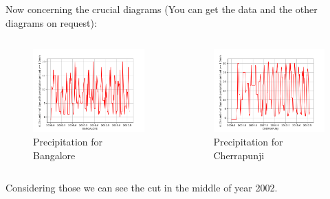 \documentclass[10pt]{beamer}
\begin{document}
\begin{frame}
	Now concerning the crucial diagrams (You can get the data and the other diagrams on request):
	\begin{columns}
		\begin{column}{0.5\textwidth}
			\begin{figure}
				\includegraphics[width=1.2\textwidth]{BangalorePrecipitation1mm.png}
				\caption{Precipitation for Bangalore}
			\end{figure}
		\end{column}
		\begin{column}{0.5\textwidth}
			\begin{figure}
				\includegraphics[width=1.2\textwidth]{CherrapunjiNumberOfDays1mm.png}
				\caption{Precipitation for Cherrapunji}
			\end{figure}
		\end{column}
		
	\end{columns}
	Considering those we can see the cut in the middle of year 2002.
\end{frame}
\end{document}
